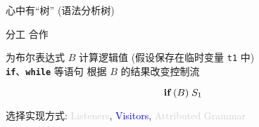 
\begin{frame}{}
\end{frame}

\begin{frame}
  \begin{center}
    心中有``树'' (语法分析树)
  \end{center}
\end{frame}

\begin{frame}{}
  \begin{center}
    {\Large 分工 \qquad 合作}

    \vspace{0.20cm}
  \end{center}

  \begin{center}
    为布尔表达式 $B$ 计算逻辑值 (假设保存在临时变量 \texttt{t1} 中) \\[5pt]
    \texttt{\bf if}、\texttt{\bf while} 等语句
    根据 $B$ 的结果改变控制流
  \end{center}

  \vspace{-0.30cm}
  \[
    \texttt{\bf if}\; (B)\; S_{1}
  \]
\end{frame}

\begin{frame}{}
  \begin{center}

    \vspace{0.30cm}
  \end{center}
\end{frame}

\begin{frame}
  \begin{center}
    选择实现方式: \textcolor{lightgray}{Listeners},
      \textcolor{blue}{Visitors},
      \textcolor{lightgray}{Attributed Grammar}
  \end{center}

  \begin{columns}
  \end{columns}

  \begin{center}
  \end{center}
\end{frame}

